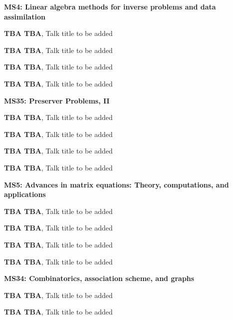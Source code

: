 \documentclass[ILAS2025-program.tex]{subfiles}
\begin{document}
\begin{description}
\begin{description}
    \item[] \textbf{MS4: Linear algebra methods for inverse problems and data assimilation} 
    \item[] \textbf{TBA TBA}, Talk title to be added
        \item[] \textbf{TBA TBA}, Talk title to be added
        \item[] \textbf{TBA TBA}, Talk title to be added
        \item[] \textbf{TBA TBA}, Talk title to be added
        \end{description}
    \begin{description}
    \item[] \textbf{MS35: Preserver Problems, II} 
    \item[] \textbf{TBA TBA}, Talk title to be added
        \item[] \textbf{TBA TBA}, Talk title to be added
        \item[] \textbf{TBA TBA}, Talk title to be added
        \item[] \textbf{TBA TBA}, Talk title to be added
        \end{description}
    \begin{description}
    \item[] \textbf{MS5: Advances in matrix equations: Theory, computations, and applications} 
    \item[] \textbf{TBA TBA}, Talk title to be added
        \item[] \textbf{TBA TBA}, Talk title to be added
        \item[] \textbf{TBA TBA}, Talk title to be added
        \item[] \textbf{TBA TBA}, Talk title to be added
        \end{description}
    \begin{description}
    \item[] \textbf{MS34: Combinatorics, association scheme, and graphs} 
    \item[] \textbf{TBA TBA}, Talk title to be added
        \item[] \textbf{TBA TBA}, Talk title to be added

\end{description}
\end{description}
\end{document}
